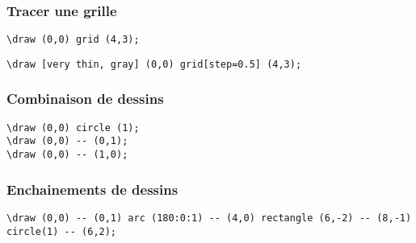 \documentclass{clic_latex_beamer}
\begin{document}
\begin{frame}[fragile]
\frametitle{Tracer une grille}

\begin{multicols}{2}
\begin{lstlisting}
\draw (0,0) grid (4,3);
\end{lstlisting}


\columnbreak
\pause

\begin{lstlisting}
\draw [very thin, gray] (0,0) grid[step=0.5] (4,3);
\end{lstlisting}


\end{multicols}

\end{frame}

\begin{frame}[fragile]
\frametitle{Combinaison de dessins}



\begin{lstlisting}
\draw (0,0) circle (1);
\draw (0,0) -- (0,1);
\draw (0,0) -- (1,0);
\end{lstlisting}

\end{frame}

\begin{frame}[fragile]
\frametitle{Enchainements de dessins}
\centering


\begin{lstlisting}
\draw (0,0) -- (0,1) arc (180:0:1) -- (4,0) rectangle (6,-2) -- (8,-1) circle(1) -- (6,2);
\end{lstlisting}

\end{frame}
\end{document}
